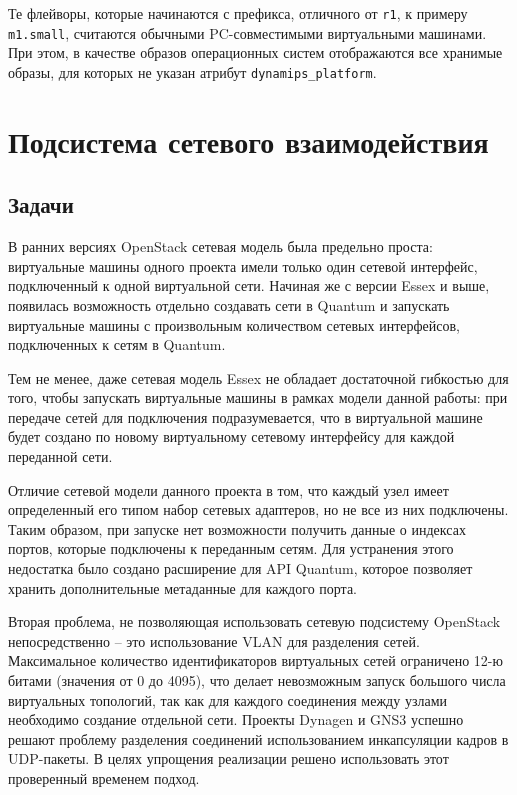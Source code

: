 Те флейворы, которые начинаются с префикса, отличного от \verb`r1`, к примеру
\verb`m1.small`, считаются обычными PC-совместимыми виртуальными машинами. 
При этом, в качестве образов операционных систем отображаются все хранимые образы, 
для которых не указан атрибут \verb`dynamips_platform`.

\section{Подсистема сетевого взаимодействия}

\subsection{Задачи}
В ранних версиях OpenStack сетевая модель была предельно проста: виртуальные машины
одного проекта имели только один сетевой интерфейс, подключенный к одной виртуальной сети.
Начиная же с версии Essex и выше, появилась возможность отдельно создавать сети в Quantum 
и запускать виртуальные машины с произвольным количеством сетевых интерфейсов, подключенных
к сетям в Quantum.

Тем не менее, даже сетевая модель Essex не обладает достаточной гибкостью для того, чтобы 
запускать виртуальные машины в рамках модели данной работы: при передаче сетей для 
подключения подразумевается, что в виртуальной машине будет создано по новому виртуальному 
сетевому интерфейсу для каждой переданной сети.

Отличие сетевой модели данного проекта в том, что каждый узел имеет определенный
его типом набор сетевых адаптеров, но не все из них подключены. Таким образом, при запуске нет
возможности получить данные о индексах портов, которые подключены к переданным сетям.
Для устранения этого недостатка было создано расширение для API Quantum, которое позволяет
хранить дополнительные метаданные для каждого порта.

Вторая проблема, не позволяющая использовать сетевую подсистему OpenStack непосредственно --
это использование VLAN для разделения сетей. Максимальное количество идентификаторов 
виртуальных сетей ограничено 12-ю битами (значения от 0 до 4095), что делает невозможным
запуск большого числа виртуальных топологий, так как для каждого соединения между узлами
необходимо создание отдельной сети. Проекты Dynagen и GNS3 успешно решают проблему 
разделения соединений использованием инкапсуляции кадров в UDP-пакеты. В целях упрощения
реализации решено использовать этот проверенный временем подход.

